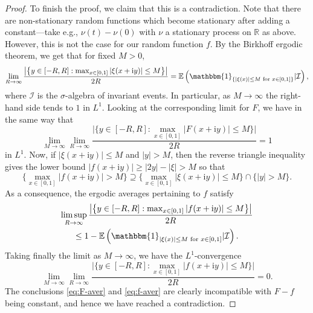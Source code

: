 \documentclass[12pt]{paper}
\numberwithin{equation}{section}
\theoremstyle{plain}
\theoremstyle{definition}
\newcommand{\bbone}{\mathbbm{1}}
\newcommand{\R}{\mathbb{R}}
\newcommand{\im}{\mathrm{i}} %
\begin{document}
\begin{proof}
  To finish the proof, we claim that this is a contradiction. Note that there are non-stationary
  random functions which become stationary after adding a constant---take e.g., \(\nu(t)-\nu(0)\)
  with \(\nu\) a stationary process on \(\R\) as above.  However, this is not the case for
  our random function \(f\). By the Birkhoff ergodic theorem, we get that for fixed \(M>0\),
  \[
    \lim_{R\to\infty}\frac{\big|\big\{y\in[-R,R]: \max_{x\in[0,1]}|\xi(x+\im y)|\le
      M\big\}\big|}{2R} =\mathbb{E}\left(\bbone_{\{|\xi(x)|\le M\text{ for
        }x\in[0,1]\}}|\mathcal{I}\right),
  \]
  where \(\mathcal{I}\) is the \(\sigma\)-algebra of invariant events.  In particular, as
  \(M\to\infty\) the right-hand side tends to \(1\) in \(L^1\).  Looking at the corresponding limit
  for \(F\), we have in the same way that
  \begin{equation}
    \label{eq:F-aver}
    \lim_{M\to\infty}\lim_{R\to\infty}\frac{\big|\big\{y\in[-R,R]:
      \max_{x\in[0,1]}|F(x+\im y)|\le M\big\}\big|}{2R}=1
  \end{equation}
  in \(L^1\).  Now, if \(|\xi(x+\im y)|\le M\) and \(|y|>M\), then the reverse triangle inequality
  gives the lower bound \(|f(x+\im y)|\ge |2y|-|\xi|>M\) so that
  \[
    \Big\{\max_{x\in[0,1]}|f(x+\im y)|>M\Big\}\supseteq \Big\{\max_{x\in[0,1]}|\xi(x+\im y)|\le
    M\Big\}\cap\Big\{|y|>M\Big\}.
  \]
  As a consequence, the ergodic averages pertaining to \(f\) satisfy
  \begin{multline*}
    \limsup_{R\to\infty}\frac{\big|\big\{y\in[-R,R]:
      \max_{x\in[0,1]}|f(x+\im y)|\le M\big\}\big|}{2R}\\
    \le 1-\mathbb{E}\left(\bbone_{|\xi(x)|\le M\text{ for }x\in[0,1]}|\mathcal{I}\right).
  \end{multline*}
  Taking finally the limit as \(M\to\infty\), we have the \(L^1\)-convergence
  \begin{equation}
    \label{eq:f-aver}
    \lim_{M\to\infty}\lim_{R\to\infty}\frac{\big|\big\{y\in[-R,R]:
      \max_{x\in[0,1]}|f(x+\im y)|\le M\big\}\big|}{2R}=0.
  \end{equation}
  The conclusions \eqref{eq:F-aver} and \eqref{eq:f-aver} are clearly incompatible with \(F-f\)
  being constant, and hence we have reached a contradiction.
\end{proof}
\end{document}
